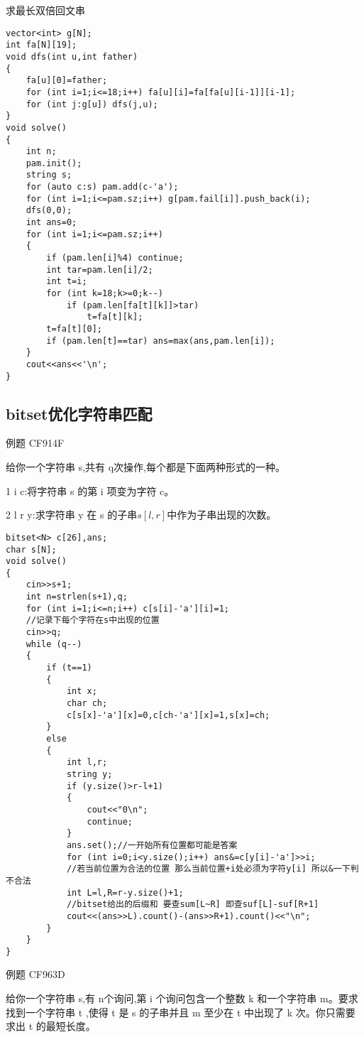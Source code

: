 \documentclass[a4paper]{ctexart}
\begin{document}
求最长双倍回文串

\begin{lstlisting}
vector<int> g[N];
int fa[N][19];
void dfs(int u,int father)
{
    fa[u][0]=father;
    for (int i=1;i<=18;i++) fa[u][i]=fa[fa[u][i-1]][i-1];
    for (int j:g[u]) dfs(j,u);
}
void solve()
{
    int n;
    pam.init();
    string s;
    for (auto c:s) pam.add(c-'a');
    for (int i=1;i<=pam.sz;i++) g[pam.fail[i]].push_back(i);
    dfs(0,0);
    int ans=0;
    for (int i=1;i<=pam.sz;i++)
    {
        if (pam.len[i]%4) continue;
        int tar=pam.len[i]/2;
        int t=i;
        for (int k=18;k>=0;k--)
            if (pam.len[fa[t][k]]>tar)
                t=fa[t][k];
        t=fa[t][0];
        if (pam.len[t]==tar) ans=max(ans,pam.len[i]);
    }
    cout<<ans<<'\n';
}
\end{lstlisting}

\subsection{bitset优化字符串匹配}

例题 CF914F

给你一个字符串 s,共有 q次操作,每个都是下面两种形式的一种。

1 i c:将字符串 s 的第 i 项变为字符 c。

2 l r y:求字符串 y 在 s 的子串$s [l , r]$中作为子串出现的次数。

\begin{lstlisting}
bitset<N> c[26],ans;
char s[N];
void solve()
{
    cin>>s+1;
    int n=strlen(s+1),q;
    for (int i=1;i<=n;i++) c[s[i]-'a'][i]=1;
    //记录下每个字符在s中出现的位置
    cin>>q;
    while (q--)
    {
        if (t==1)
        {
            int x;
            char ch;
            c[s[x]-'a'][x]=0,c[ch-'a'][x]=1,s[x]=ch;
        }
        else
        {
            int l,r;
            string y;
            if (y.size()>r-l+1)
            {
                cout<<"0\n";
                continue;
            }
            ans.set();//一开始所有位置都可能是答案
            for (int i=0;i<y.size();i++) ans&=c[y[i]-'a']>>i;
            //若当前位置为合法的位置 那么当前位置+i处必须为字符y[i] 所以&一下判不合法
            int L=l,R=r-y.size()+1;
            //bitset给出的后缀和 要查sum[L~R] 即查suf[L]-suf[R+1]
            cout<<(ans>>L).count()-(ans>>R+1).count()<<"\n";
        }
    }
}
\end{lstlisting}

例题 CF963D

给你一个字符串 s,有 n个询问,第 i 个询问包含一个整数 k 和一个字符串 m。要求找到一个字符串 t ,使得 t 是 s 的子串并且 m 至少在 t 中出现了 k 次。你只需要求出 t 的最短长度。
\end{document}

